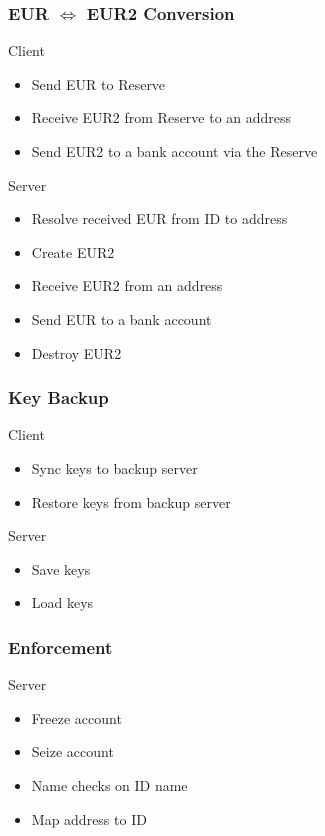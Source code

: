 \documentclass[12pt]{article} %
\begin{document}
{{\subsubsection{EUR $\Leftrightarrow$ EUR2 Conversion} \label{sssec:3.3:conversion}

Client
\begin{itemize}
	\item Send EUR to Reserve
	\item Receive EUR2 from Reserve to an address
	\item Send EUR2 to a bank account via the Reserve
\end{itemize}

Server
\begin{itemize}
	\item Resolve received EUR from ID to address
	\item Create EUR2
	\item Receive EUR2 from an address
	\item Send EUR to a bank account
	\item Destroy EUR2
\end{itemize}

\subsubsection{Key Backup} \label{sssec:3.3:backup}

Client
\begin{itemize}
	\item Sync keys to backup server
	\item Restore keys from backup server
\end{itemize}

Server
\begin{itemize}
	\item Save keys
	\item Load keys
\end{itemize}

\subsubsection{Enforcement} \label{sssec:3.3:enforcement}

Server
\begin{itemize}
	\item Freeze account
	\item Seize account
	\item Name checks on ID name
	\item Map address to ID
\end{itemize}

}}
\end{document}
